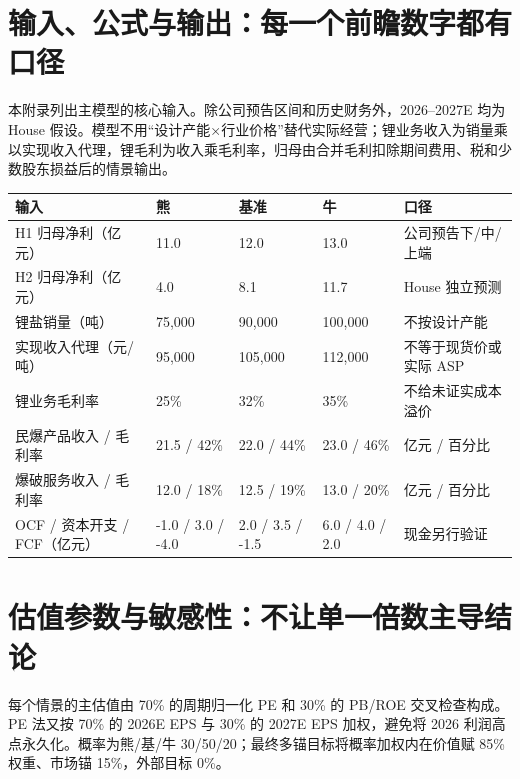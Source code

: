 \section{输入、公式与输出：每一个前瞻数字都有口径}

本附录列出主模型的核心输入。除公司预告区间和历史财务外，2026--2027E 均为 House 假设。模型不用“设计产能×行业价格”替代实际经营；锂业务收入为销量乘以实现收入代理，锂毛利为收入乘毛利率，归母由合并毛利扣除期间费用、税和少数股东损益后的情景输出。

\begin{exhibitbox}
\begin{tabularx}{\exhibitboxwidth}{L{3.6cm}R{2.0cm}R{2.0cm}R{2.0cm}X}
\toprule
输入 & 熊 & 基准 & 牛 & 口径 \\
\midrule
H1 归母净利（亿元） & 11.0 & 12.0 & 13.0 & 公司预告下/中/上端 \\
H2 归母净利（亿元） & 4.0 & 8.1 & 11.7 & House 独立预测 \\
锂盐销量（吨） & 75,000 & 90,000 & 100,000 & 不按设计产能 \\
实现收入代理（元/吨） & 95,000 & 105,000 & 112,000 & 不等于现货价或实际 ASP \\
锂业务毛利率 & 25\% & 32\% & 35\% & 不给未证实成本溢价 \\
民爆产品收入 / 毛利率 & 21.5 / 42\% & 22.0 / 44\% & 23.0 / 46\% & 亿元 / 百分比 \\
爆破服务收入 / 毛利率 & 12.0 / 18\% & 12.5 / 19\% & 13.0 / 20\% & 亿元 / 百分比 \\
OCF / 资本开支 / FCF（亿元） & -1.0 / 3.0 / -4.0 & 2.0 / 3.5 / -1.5 & 6.0 / 4.0 / 2.0 & 现金另行验证 \\
\bottomrule
\end{tabularx}
\end{exhibitbox}

\section{估值参数与敏感性：不让单一倍数主导结论}

每个情景的主估值由 70\% 的周期归一化 PE 和 30\% 的 PB/ROE 交叉检查构成。PE 法又按 70\% 的 2026E EPS 与 30\% 的 2027E EPS 加权，避免将 2026 利润高点永久化。概率为熊/基/牛 30/50/20；最终多锚目标将概率加权内在价值赋 85\% 权重、市场锚 15\%，外部目标 0\%。

